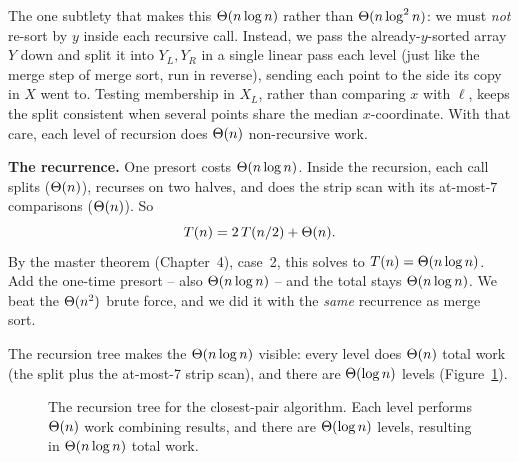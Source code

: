 The one subtlety that makes this $\Theta(n \log n)$ rather than $\Theta(n \log^2 n)$:
we must \emph{not} re-sort by $y$ inside each recursive call. Instead, we pass the
already-$y$-sorted array $Y$ down and split it into $Y_L, Y_R$ in a single linear
pass each level (just like the merge step of merge sort, run in reverse),
sending each point to the side its copy in $X$ went to. Testing membership in
$X_L$, rather than comparing $x$ with $\ell$, keeps the split consistent when
several points share the median $x$-coordinate. With that
care, each level of recursion does $\Theta(n)$ non-recursive work.

\begin{complexitybox}
\textbf{The recurrence.} One presort costs $\Theta(n \log n)$. Inside the recursion,
each call splits ($\Theta(n)$), recurses on two halves, and does the strip scan with
its at-most-$7$ comparisons ($\Theta(n)$). So
\[
  T(n) = 2\,T(n/2) + \Theta(n).
\]
By the master theorem (Chapter~4), case~2, this solves to
$T(n) = \Theta(n \log n)$. Add the one-time presort -- also $\Theta(n \log n)$ -- and
the total stays $\Theta(n \log n)$. We beat the $\Theta(n^2)$ brute force, and we did it
with the \emph{same} recurrence as merge sort.
\end{complexitybox}

The recursion tree makes the $\Theta(n \log n)$ visible: every level does $\Theta(n)$
total work (the split plus the at-most-7 strip scan), and there are $\Theta(\log n)$
levels (Figure~\ref{ch32:fig-rectree}).

\begin{figure}[htbp]
\centering
{}
\caption{The recursion tree for the closest-pair algorithm. Each level performs $\Theta(n)$ work combining results, and there are $\Theta(\log n)$ levels, resulting in $\Theta(n \log n)$ total work.}
\label{ch32:fig-rectree}
\end{figure}

